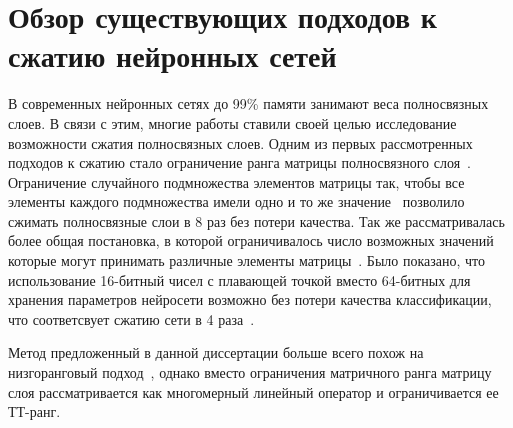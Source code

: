 \section{Обзор существующих подходов к сжатию нейронных сетей} \label{sec:tensornet-alternatives}
В современных нейронных сетях до 99\% памяти занимают веса полносвязных слоев. В связи с этим, многие работы ставили своей целью исследование возможности сжатия полносвязных слоев. Одним из первых рассмотренных подходов к сжатию стало ограничение ранга матрицы полносвязного слоя~\cite{Denil2013predicting}. Ограничение случайного подмножества элементов матрицы так, чтобы все элементы каждого подмножества имели одно и то же значение~\cite{chen2015compressing} позволило сжимать полносвязные слои в 8 раз без потери качества. Так же рассматривалась более общая постановка, в которой ограничивалось число возможных значений которые могут принимать различные элементы матрицы~\cite{gong2014PQcompressing}. Было показано, что использование 16-битный чисел с плавающей точкой вместо 64-битных  для хранения параметров нейросети возможно без потери качества классификации, что соответсвует сжатию сети в 4 раза~\cite{Gupta2015floatingPoint}.

Метод предложенный в данной диссертации больше всего похож на низгоранговый подход~\cite{Denil2013predicting}, однако вместо ограничения матричного ранга матрицу слоя рассматривается как многомерный линейный оператор и ограничивается ее ТТ-ранг.



